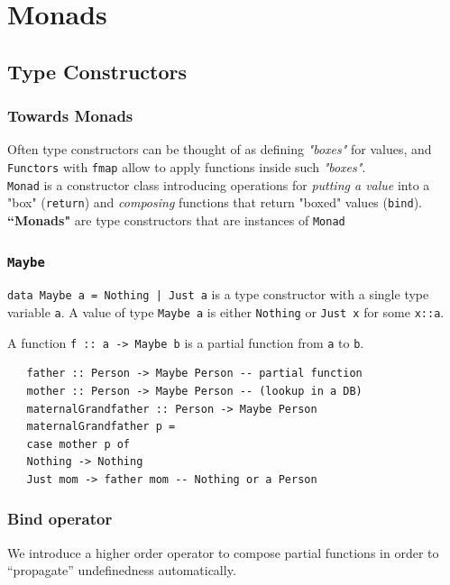 \chapter{Monads}
\section{Type Constructors}

\subsection{Towards Monads}
Often type constructors can be thought of as
defining \textit{"boxes"} for values, and \lstinline|Functors| with \lstinline|fmap| allow to apply functions
inside such \textit{"boxes"}.\\
\lstinline|Monad| is a constructor class introducing
operations for \textit{putting a value} into a "box" (\lstinline|return|) and \textit{composing} functions that return "boxed" values (\lstinline|bind|).\\
\textbf{``Monads"} are type constructors that are instances of \lstinline|Monad|



\subsection{\texttt{Maybe}}
\lstinline{data Maybe a = Nothing | Just a} is a type constructor with a single type variable \lstinline|a|.
A value of type \lstinline|Maybe a| is either \lstinline|Nothing| or \lstinline|Just x| for some \lstinline|x::a|.

A function \lstinline|f :: a -> Maybe b| is a partial function from
\lstinline|a| to \lstinline|b|.
\begin{lstlisting}
   father :: Person -> Maybe Person -- partial function
   mother :: Person -> Maybe Person -- (lookup in a DB)
   maternalGrandfather :: Person -> Maybe Person
   maternalGrandfather p =
   case mother p of
   Nothing -> Nothing
   Just mom -> father mom -- Nothing or a Person
\end{lstlisting}

\subsection{Bind operator}


We introduce a higher order operator to
compose partial functions in order to
“propagate” undefinedness automatically.

